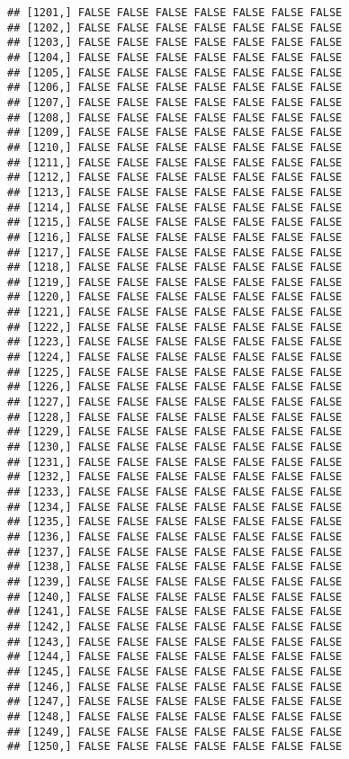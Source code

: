 \documentclass[
]{article}
\begin{document}
\begin{verbatim}
## [1201,] FALSE FALSE FALSE FALSE FALSE FALSE FALSE
## [1202,] FALSE FALSE FALSE FALSE FALSE FALSE FALSE
## [1203,] FALSE FALSE FALSE FALSE FALSE FALSE FALSE
## [1204,] FALSE FALSE FALSE FALSE FALSE FALSE FALSE
## [1205,] FALSE FALSE FALSE FALSE FALSE FALSE FALSE
## [1206,] FALSE FALSE FALSE FALSE FALSE FALSE FALSE
## [1207,] FALSE FALSE FALSE FALSE FALSE FALSE FALSE
## [1208,] FALSE FALSE FALSE FALSE FALSE FALSE FALSE
## [1209,] FALSE FALSE FALSE FALSE FALSE FALSE FALSE
## [1210,] FALSE FALSE FALSE FALSE FALSE FALSE FALSE
## [1211,] FALSE FALSE FALSE FALSE FALSE FALSE FALSE
## [1212,] FALSE FALSE FALSE FALSE FALSE FALSE FALSE
## [1213,] FALSE FALSE FALSE FALSE FALSE FALSE FALSE
## [1214,] FALSE FALSE FALSE FALSE FALSE FALSE FALSE
## [1215,] FALSE FALSE FALSE FALSE FALSE FALSE FALSE
## [1216,] FALSE FALSE FALSE FALSE FALSE FALSE FALSE
## [1217,] FALSE FALSE FALSE FALSE FALSE FALSE FALSE
## [1218,] FALSE FALSE FALSE FALSE FALSE FALSE FALSE
## [1219,] FALSE FALSE FALSE FALSE FALSE FALSE FALSE
## [1220,] FALSE FALSE FALSE FALSE FALSE FALSE FALSE
## [1221,] FALSE FALSE FALSE FALSE FALSE FALSE FALSE
## [1222,] FALSE FALSE FALSE FALSE FALSE FALSE FALSE
## [1223,] FALSE FALSE FALSE FALSE FALSE FALSE FALSE
## [1224,] FALSE FALSE FALSE FALSE FALSE FALSE FALSE
## [1225,] FALSE FALSE FALSE FALSE FALSE FALSE FALSE
## [1226,] FALSE FALSE FALSE FALSE FALSE FALSE FALSE
## [1227,] FALSE FALSE FALSE FALSE FALSE FALSE FALSE
## [1228,] FALSE FALSE FALSE FALSE FALSE FALSE FALSE
## [1229,] FALSE FALSE FALSE FALSE FALSE FALSE FALSE
## [1230,] FALSE FALSE FALSE FALSE FALSE FALSE FALSE
## [1231,] FALSE FALSE FALSE FALSE FALSE FALSE FALSE
## [1232,] FALSE FALSE FALSE FALSE FALSE FALSE FALSE
## [1233,] FALSE FALSE FALSE FALSE FALSE FALSE FALSE
## [1234,] FALSE FALSE FALSE FALSE FALSE FALSE FALSE
## [1235,] FALSE FALSE FALSE FALSE FALSE FALSE FALSE
## [1236,] FALSE FALSE FALSE FALSE FALSE FALSE FALSE
## [1237,] FALSE FALSE FALSE FALSE FALSE FALSE FALSE
## [1238,] FALSE FALSE FALSE FALSE FALSE FALSE FALSE
## [1239,] FALSE FALSE FALSE FALSE FALSE FALSE FALSE
## [1240,] FALSE FALSE FALSE FALSE FALSE FALSE FALSE
## [1241,] FALSE FALSE FALSE FALSE FALSE FALSE FALSE
## [1242,] FALSE FALSE FALSE FALSE FALSE FALSE FALSE
## [1243,] FALSE FALSE FALSE FALSE FALSE FALSE FALSE
## [1244,] FALSE FALSE FALSE FALSE FALSE FALSE FALSE
## [1245,] FALSE FALSE FALSE FALSE FALSE FALSE FALSE
## [1246,] FALSE FALSE FALSE FALSE FALSE FALSE FALSE
## [1247,] FALSE FALSE FALSE FALSE FALSE FALSE FALSE
## [1248,] FALSE FALSE FALSE FALSE FALSE FALSE FALSE
## [1249,] FALSE FALSE FALSE FALSE FALSE FALSE FALSE
## [1250,] FALSE FALSE FALSE FALSE FALSE FALSE FALSE

\end{verbatim}
\end{document}
